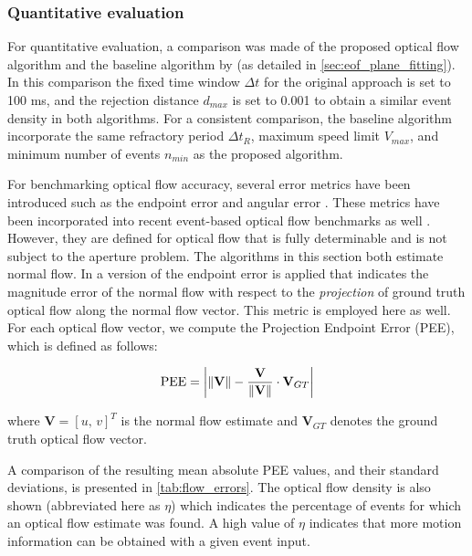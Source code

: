 \subsubsection{Quantitative evaluation}
For quantitative evaluation, a comparison was made of the proposed optical flow algorithm and the baseline algorithm by \citet{Benosman2014} (as detailed in \cref{sec:eof_plane_fitting}). In this comparison the fixed time window $\Delta t$ for the original approach is set to 100 ms, and the rejection distance $d_{max}$ is set to 0.001 to obtain a similar event density in both algorithms. For a consistent comparison, the baseline algorithm incorporate the same refractory period $\Delta t_R$, maximum speed limit $V_{max}$, and minimum number of events $n_{min}$ as the proposed algorithm.

For benchmarking optical flow accuracy, several error metrics have been introduced such as the endpoint error and angular error \cite{Baker2011}. These metrics have been incorporated into recent event-based optical flow benchmarks as well \cite{Ruckauer2016}. However, they are defined for optical flow that is fully determinable and is not subject to the aperture problem. The algorithms in this section both estimate normal flow. In \citet{Barranco2014} a version of the endpoint error is applied that indicates the magnitude error of the normal flow with respect to the \emph{projection} of ground truth optical flow along the normal flow vector. This metric is employed here as well. For each optical flow vector, we compute the Projection Endpoint Error (PEE), which is defined as follows:

\begin{equation}
\label{eq:PEE}
\mathrm{PEE} = \left| {\left\| {\bf{V}} \right\| - \frac{{\bf{V}}}{{\left\| {\bf{V}} \right\|}} \cdot {{\bf{V}}_{GT}}} \right|
\end{equation}

where $\mathbf{V}=\left[u,\,v\right]^T$ is the normal flow estimate and $\mathbf{V}_{GT}$ denotes the ground truth optical flow vector.

A comparison of the resulting mean absolute PEE values, and their standard deviations, is presented in \cref{tab:flow_errors}. The optical flow density is also shown (abbreviated here as $\eta$) which indicates the percentage of events for which an optical flow estimate was found. A high value of $\eta$ indicates that more motion information can be obtained with a given event input. 


